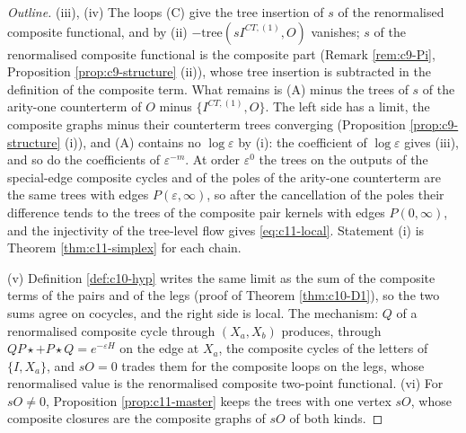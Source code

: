 \begin{proof}[Outline]
(iii), (iv) The loops (C) give the tree insertion of $s$ of the renormalised composite functional, and by (ii) $-\text{tree}(sI^{CT,(1)},O)$ vanishes; $s$ of the renormalised composite functional is the composite part (Remark \ref{rem:c9-Pi}, Proposition \ref{prop:c9-structure} (ii)), whose tree insertion is subtracted in the definition of the composite term. What remains is (A) minus the trees of $s$ of the arity-one counterterm of $O$ minus $\{I^{CT,(1)},O\}$. The left side has a limit, the composite graphs minus their counterterm trees converging (Proposition \ref{prop:c9-structure} (i)), and (A) contains no $\log\varepsilon$ by (i): the coefficient of $\log\varepsilon$ gives (iii), and so do the coefficients of $\varepsilon^{-m}$. At order $\varepsilon^0$ the trees on the outputs of the special-edge composite cycles and of the poles of the arity-one counterterm are the same trees with edges $P(\varepsilon,\infty)$, so after the cancellation of the poles their difference tends to the trees of the composite pair kernels with edges $P(0,\infty)$, and the injectivity of the tree-level flow gives \eqref{eq:c11-local}. Statement (i) is Theorem \ref{thm:c11-simplex} for each chain.

(v) Definition \ref{def:c10-hyp} writes the same limit as the sum of the composite terms of the pairs and of the legs (proof of Theorem \ref{thm:c10-D1}), so the two sums agree on cocycles, and the right side is local. The mechanism: $Q$ of a renormalised composite cycle through $(X_a,X_b)$ produces, through $QP\star+P\star Q=e^{-\varepsilon H}$ on the edge at $X_a$, the composite cycles of the letters of $\{I,X_a\}$, and $sO=0$ trades them for the composite loops on the legs, whose renormalised value is the renormalised composite two-point functional. (vi) For $sO\ne0$, Proposition \ref{prop:c11-master} keeps the trees with one vertex $sO$, whose composite closures are the composite graphs of $sO$ of both kinds.
\end{proof}

